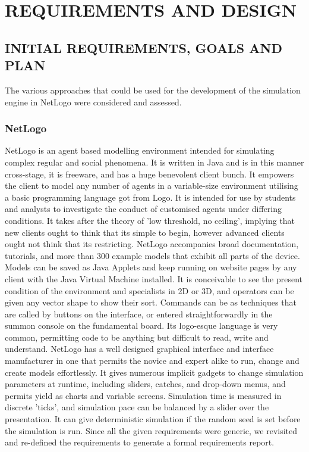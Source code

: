\documentclass[11pt,a4paper]{article}
\begin{document}
\section{REQUIREMENTS AND DESIGN}

\subsection{INITIAL REQUIREMENTS, GOALS AND PLAN}

The various approaches that could be used for the development of the simulation engine in NetLogo were considered and assessed.

\subsubsection{NetLogo}

NetLogo is an agent based modelling environment intended for simulating complex regular and social phenomena. It is written in Java and is in this manner cross-stage, it is freeware, and has a huge benevolent client bunch. It empowers the client to model any number of agents in a variable-size environment utilising a basic programming language got from Logo. It is intended for use by students and analysts to investigate the conduct of customised agents under differing conditions. It takes after the theory of 'low threshold, no ceiling', implying that new clients ought to think that its simple to begin, however advanced clients ought not think that its restricting. NetLogo accompanies broad documentation, tutorials, and more than 300 example models that exhibit all parts of the device. Models can be saved as Java Applets and keep running on website pages by any client with the Java Virtual Machine installed. It is conceivable to see the present condition of the environment and specialists in 2D or 3D, and operators can be given any vector shape to show their sort. Commands can be as techniques that are called by buttons on the interface, or entered straightforwardly in the summon console on the fundamental board. Its logo-esque language is very common, permitting code to be anything but difficult to read, write and understand.\newline 
NetLogo has a well designed graphical interface and interface manufacturer in one that permits the novice and expert alike to run, change and create models effortlessly. It gives numerous implicit gadgets to change simulation parameters at runtime, including sliders, catches, and drop-down menus, and permits yield as charts and variable screens. Simulation time is measured in discrete 'ticks', and simulation pace can be balanced by a slider over the presentation. It can give deterministic simulation if the random seed is set before the simulation is run.\newline
Since all the given requirements were generic, we revisited and re-defined the requirements to generate a formal requirements report.
\end{document}
